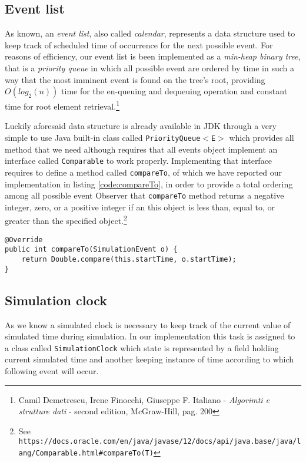 \documentclass[10pt,a4paper]{article}
\begin{document}
\subsection{Event list}

As known, an \textit{event list}, also called \textit{calendar}, represents a data structure used to keep track of scheduled time of occurrence for the next possible event.
For reasons of efficiency, our event list is been implemented as a \textit{min-heap binary tree}, that is a \textit{priority queue} in which all possible event are ordered by time in such a way that the most imminent event is found on the tree's root, providing $O(log_2(n))$ time for the en-queuing and dequeuing operation and constant time for root element retrieval.\footnote{Camil Demetrescu, Irene Finocchi, Giuseppe F. Italiano - \textit{Algorimti e strutture dati} - second edition, McGraw-Hill, pag. 200} 

Luckily aforesaid data structure is already available in JDK through a very simple to use Java built-in class called \texttt{PriorityQueue$<$E$>$} which provides all method that we need although requires that all events object implement an interface called \texttt{Comparable} to work properly. Implementing that interface requires to define a method called \texttt{compareTo}, of which we have reported our implementation in listing \ref{code:compareTo}, in order to provide a total ordering among all possible event 
Observer that \texttt{compareTo} method returns a negative integer, zero, or a positive integer if an  this object is less than, equal to, or greater than the specified object.\footnote{See \texttt{https://docs.oracle.com/en/java/javase/12/docs/api/java.base/java/lang/Comparable.html\#compareTo(T)}}


\begin{lstlisting}[frame=lines, caption={Snippet of \texttt{SimulationEvent} class}, label={code:compareTo}]
@Override
public int compareTo(SimulationEvent o) {
	return Double.compare(this.startTime, o.startTime);
}
\end{lstlisting}




\subsection{Simulation clock}

As we know a simulated clock is necessary to keep track of the current value of simulated time during simulation. In our implementation this task is assigned to a class called 
\texttt{SimulationClock} which state is represented by a field holding current simulated time and another keeping instance of time according to which following event will occur.
\end{document}
